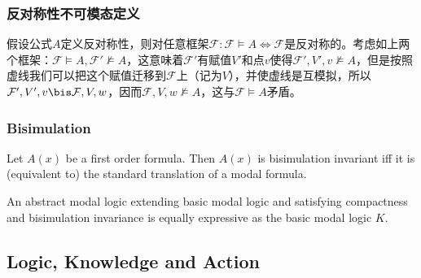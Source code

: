 \documentclass[UTF8,11pt,colorlinks,compress,openany]{beamer}%
\begin{document}
\begin{frame}\frametitle{反对称性不可模态定义}
\begin{center}
\end{center}
假设公式$A$定义反对称性，则对任意框架$\mathcal{F}: \mathcal{F}\vDash A\iff\mathcal{F}$是反对称的。考虑如上两个框架：$\mathcal{F}\vDash A, \mathcal{F}'\nvDash A$，这意味着$\mathcal{F}'$有赋值$V'$和点$v$使得$\mathcal{F}',V',v\nvDash A$，但是按照虚线我们可以把这个赋值迁移到$\mathcal{F}$上（记为$V$），并使虚线是互模拟，所以$\mathcal{F}',V',v\bis\mathcal{F},V,w$，因而$\mathcal{F},V,w\nvDash A$，这与$\mathcal{F}\vDash A$矛盾。
\end{frame}

\begin{frame}\frametitle{Bisimulation}
	\begin{theorem}
		Let $A(x)$ be a first order formula. Then $A(x)$ is bisimulation invariant iff it is (equivalent to) the standard translation of a modal formula.
	\end{theorem}
	\begin{theorem}
		An abstract modal logic extending basic modal logic and satisfying compactness and bisimulation invariance is equally expressive as the basic modal logic $K$.
	\end{theorem}
\end{frame}

\subsection{Logic, Knowledge and Action}
\end{document}
